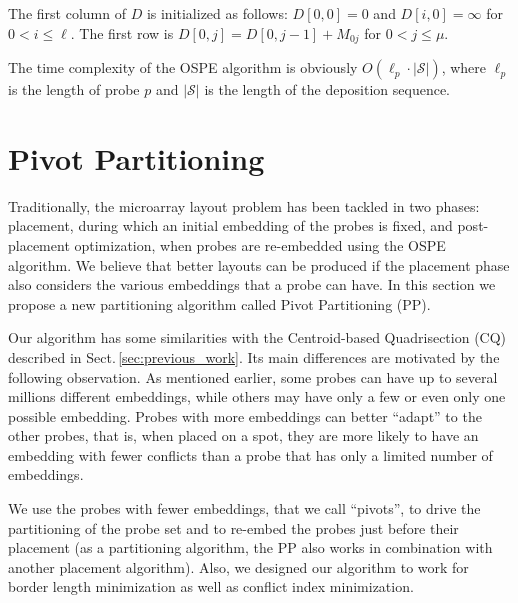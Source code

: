 \documentclass{llncs}
\begin{document}
The first column of $D$ is initialized as follows: $D[0,0] = 0$ and $D[i,0] =
\infty$ for $0 < i \leq \ell$. The first row is $D[0,j] = D[0,j-1]+M_{0j}$ for
$0<j\leq\mu$.

The time complexity of the OSPE algorithm is obviously $O(\ell_p \cdot
|\mathcal{S}|)$, where $\ell_p$ is the length of probe $p$ and $|\mathcal{S}|$
is the length of the deposition sequence.


\section{Pivot Partitioning}
\label{sec:pivotpart}

Traditionally, the microarray layout problem has been tackled in two phases:
placement, during which an initial embedding of the probes is fixed, and
post-placement optimization, when probes are re-embedded using the OSPE algorithm.
We believe that better layouts can be produced if the placement phase also considers
the various embeddings that a probe can have. In this section we propose a new
partitioning algorithm called Pivot Partitioning (PP).

Our algorithm
has some similarities with the Centroid-based Quadrisection (CQ) described
in Sect.\,\ref{sec:previous_work}.
Its main differences are motivated by the following observation.
As mentioned earlier, some probes can have up to several millions different
embeddings, while others may have only a few or even only one possible embedding.
Probes with more embeddings can better
``adapt'' to the other probes, that is, when placed on a spot, they are more likely
to have an embedding with fewer conflicts than a probe that has
only a limited number of embeddings.

We use the probes with fewer embeddings, that we call ``pivots'', to drive the
partitioning of the probe set and to re-embed the probes just before their
placement (as a partitioning algorithm, the PP also works in combination with
another placement algorithm). Also, we designed our algorithm to work for border
length minimization as well as conflict index minimization.
\end{document}
